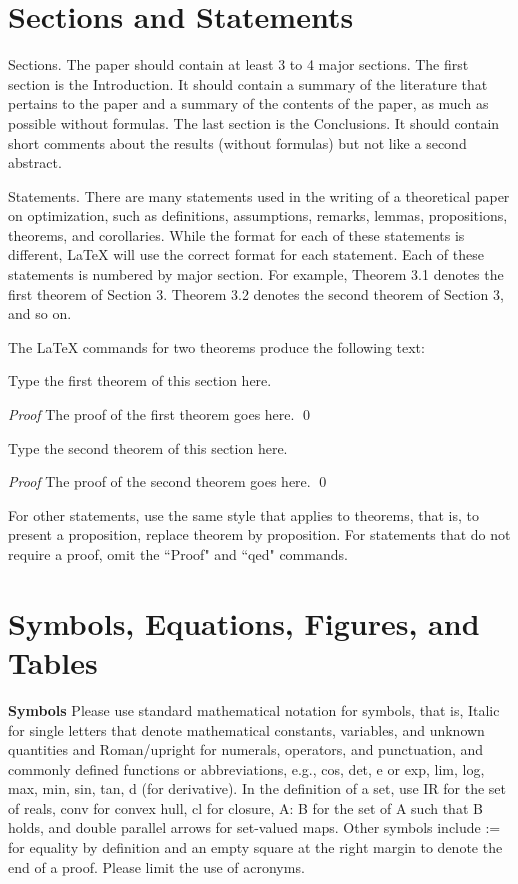 \documentclass[smallextended,referee,envcountsect,]{svjour3}
\begin{document}
\section{Sections and Statements}

Sections. The paper should contain at least 3 to 4 major sections. The first section is the Introduction. It should contain a summary of the literature that pertains to the paper and a summary of the contents of the paper, as much as possible without formulas. The last section is the Conclusions. It should contain short comments about the results (without formulas) but not like a second abstract.

Statements.  There are many statements used in the writing of a theoretical paper on optimization, such as definitions, assumptions,  remarks,  lemmas, propositions, theorems, and corollaries. While the format for each of these statements is different, LaTeX will use the correct format for each statement.  Each of these statements is numbered by major section. For example,  Theorem 3.1 denotes the first theorem of Section 3. Theorem 3.2 denotes the second theorem of Section 3, and so on.

The LaTeX commands for two theorems produce the following text:

\begin{theorem}
Type the first theorem of this section here.
\end{theorem}
{\it Proof}  The proof of the first theorem goes here.
\qed
\begin{theorem}
Type the second theorem of this section here.
\end{theorem}
{\it Proof}  The proof of the second theorem goes here.
\qed

For  other statements, use the same style that applies to theorems, that is, to present a proposition, replace theorem by proposition.  For statements that do not require a proof, omit the ``Proof" and ``qed" commands.


\section{Symbols, Equations, Figures, and Tables}

{\bf Symbols} Please use standard mathematical notation for  symbols, that is, Italic for single letters that denote mathematical constants, variables, and unknown quantities and Roman/upright for numerals, operators, and punctuation, and commonly defined functions or abbreviations, e.g., cos, det, e or exp, lim, log, max, min, sin, tan, d (for derivative). In the definition of a set, use IR for the set of reals, conv for convex hull, cl for closure, {A: B} for the set of A such that B holds, and double parallel arrows for set-valued maps.  Other symbols include  := for equality by definition and   an empty square at the right margin to denote the end of a proof. Please limit the use of acronyms.
\end{document}
